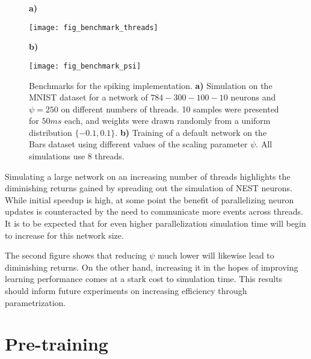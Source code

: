 \begin{figure}[h]
    \centering
    \begin{minipage}{0.5\textwidth}
        \textbf{a)}\par\medskip
        \centering
        \texttt{[image: fig\_benchmark\_threads]}
    \end{minipage}\hfill
    \begin{minipage}{0.5\textwidth}
        \textbf{b)}\par\medskip
        \centering
        \texttt{[image: fig\_benchmark\_psi]}
    \end{minipage}
    \caption[Benchmarks for the spiking implementation]{Benchmarks for the spiking implementation. \textbf{a)}
        Simulation on the MNIST dataset for a network of $784-300-100-10$ neurons and $\psi=250$ on different numbers of
        threads. 10 samples were presented for $50ms$ each, and weights were drawn randomly from a uniform distribution
        $ \{-0.1, 0.1\}$. \textbf{b)} Training of a default network on the Bars dataset using different values of the
        scaling parameter $\psi$. All simulations use 8 threads.}
    \label{fig-benchmark-threads-psi}
\end{figure}

Simulating a large network on an increasing number of threads highlights the diminishing returns gained by spreading out
the simulation of NEST neurons. While initial speedup is high, at some point the benefit of parallelizing neuron updates
is counteracted by the need to communicate more events across threads. It is to be expected that for even higher
parallelization simulation time will begin to increase for this network size.

The second figure shows that reducing $\psi$ much lower will likewise lead to diminishing returns. On the other hand,
increasing it in the hopes of improving learning performance comes at a stark cost to simulation time. This results
should inform future experiments on increasing efficiency through parametrization.

\section{Pre-training}

